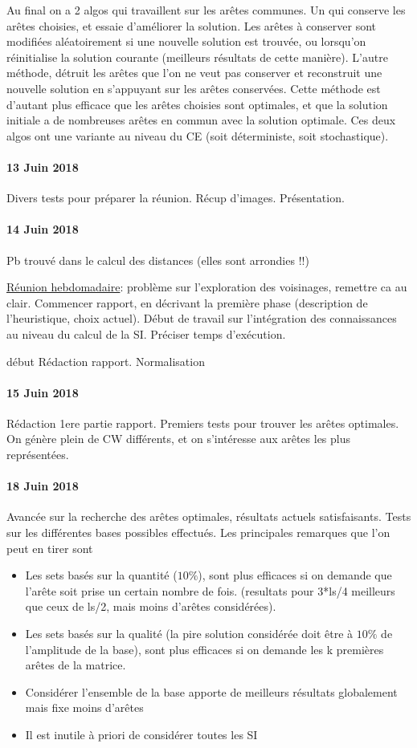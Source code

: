 \documentclass[a4paper,11pt]{article}%
\begin{document}
Au final on a 2 algos qui travaillent sur les arêtes communes. Un qui conserve les arêtes choisies, et essaie d'améliorer la solution. Les arêtes à conserver sont modifiées aléatoirement si une nouvelle solution est trouvée, ou lorsqu'on réinitialise la solution courante (meilleurs résultats de cette manière). 
L'autre méthode, détruit les arêtes que l'on ne veut pas conserver et reconstruit une nouvelle solution en s'appuyant sur les arêtes conservées. Cette méthode est d'autant plus efficace que les arêtes choisies sont optimales, et que la solution initiale a de nombreuses arêtes en commun avec la solution optimale.
Ces deux algos ont une variante au niveau du CE (soit déterministe, soit stochastique).
\paragraph*{13 Juin 2018}
Divers tests pour préparer la réunion. Récup d'images. Présentation.

\paragraph*{14 Juin 2018}
Pb trouvé dans le calcul des distances (elles sont arrondies !!)

\underline{Réunion hebdomadaire}: problème sur l'exploration des voisinages, remettre ca au clair. Commencer rapport, en décrivant la première phase (description de l'heuristique, choix actuel). Début de travail sur l'intégration des connaissances au niveau du calcul de la SI. Préciser temps d'exécution. 

début Rédaction rapport. Normalisation 

\paragraph*{15 Juin 2018}
Rédaction 1ere partie rapport. Premiers tests pour trouver les arêtes optimales. On génère plein de CW différents, et on s'intéresse aux arêtes les plus représentées.

\paragraph*{18 Juin 2018}
Avancée sur la recherche des arêtes optimales, résultats actuels satisfaisants. 
Tests sur les différentes bases possibles effectués. Les principales remarques que l'on peut en tirer sont
\begin{itemize}
\item Les sets basés sur la quantité ($10\%$), sont plus efficaces si on demande que l'arête soit prise un certain nombre de fois. (resultats pour 3*ls/4 meilleurs que ceux de ls/2, mais moins d'arêtes considérées).
\item Les sets basés sur la qualité (la pire solution considérée doit être à $10\%$ de l'amplitude de la base), sont plus efficaces si on demande les k premières arêtes de la matrice.
\item Considérer l'ensemble de la base apporte de meilleurs résultats globalement mais fixe moins d'arêtes
\item Il est inutile à priori de considérer toutes les SI
\end{itemize}
\end{document}

